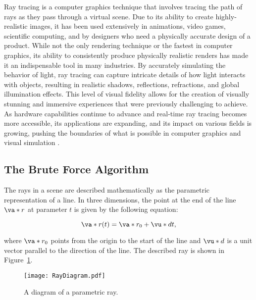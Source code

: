 \par Ray tracing is a computer graphics technique that involves tracing the path of rays as they pass through a virtual scene. Due to its ability to create highly-realistic images, it has been used extensively in animations, video games, scientific computing, and by designers who need a physically accurate design of a product. While not the only rendering technique or the fastest in computer graphics, its ability to consistently produce physically realistic renders has made it an indispensable tool in many industries. By accurately simulating the behavior of light, ray tracing can capture intricate details of how light interacts with objects, resulting in realistic shadows, reflections, refractions, and global illumination effects. This level of visual fidelity allows for the creation of visually stunning and immersive experiences that were previously challenging to achieve. As hardware capabilities continue to advance and real-time ray tracing becomes more accessible, its applications are expanding, and its impact on various fields is growing, pushing the boundaries of what is possible in computer graphics and visual simulation \cite{Peddie}.

\subsection{The Brute Force Algorithm}
The rays in a scene are described mathematically as the parametric representation of a line. In three dimensions, the point at the end of the line $\va*{r}$ at parameter $t$ is given by the following equation:

\begin{equation}
\va*{r}(t) = \va*{r_0} + \vu*{d} t,
\label{eq:parametric_ray}
\end{equation}

\noindent where $\va*{r_0}$ points from the origin to the start of the line and $\vu*{d}$ is a unit vector parallel to the direction of the line. The described ray is shown in Figure~\ref{fig:ray_diagram}.\\

\begin{figure}[H]
    \centering
	\texttt{[image: RayDiagram.pdf]}
	\caption{A diagram of a parametric ray.}
	\label{fig:ray_diagram}
\end{figure}

